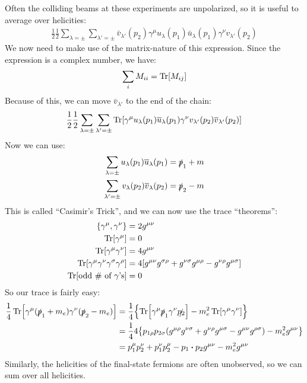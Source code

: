 Often the colliding beams at these experiments are unpolarized, so it is useful to average over helicities:
\begin{align*}
  \frac12\frac12\sum_{\lambda=\pm}\sum_{\lambda'=\pm}
  \bar{v}_{\lambda'}(p_2)\gamma^\mu u_\lambda(p_1)
  \bar{u}_{\lambda}(p_1)\gamma^\nu v_{\lambda'}(p_2)
\end{align*}
We now need to make use of the matrix-nature of this expression. Since the expression is a complex number, we have:
\begin{align*}
  \sum_i M_{ii}=\Tr[M_{ij}]
\end{align*}
Because of this, we can move $\bar{v}_{\lambda'}$ to the end of the chain:
\begin{align*}
  \frac12\frac12\sum_{\lambda=\pm}\sum_{\lambda'=\pm}\Tr[
  \gamma^\mu u_\lambda(p_1)\overline{u}_{\lambda}(p_1)
  \gamma^\nu v_{\lambda'}(p_2)\overline{v}_{\lambda'}(p_2)]
\end{align*}
Now we can use:
\begin{align*}
  \sum_{\lambda=\pm}u_\lambda(p_1)\overline{u}_\lambda(p_1)&=\slashed{p}_1+m\\
  \sum_{\lambda'=\pm}v_\lambda(p_2)\overline{v}_\lambda(p_2)&=\slashed{p}_2-m
\end{align*}
This is called ``Casimir's Trick'', and we can now use the trace ``theorems'':
\begin{align*}
  \acomm{\gamma^\mu}{\gamma^\nu}&=2g^{\mu\nu}\\
  \Tr[\gamma^\mu]&=0\\
  \Tr[\gamma^\mu\gamma^\nu]&=4g^{\mu\nu}\\
  \Tr[\gamma^\mu\gamma^\nu\gamma^\sigma\gamma^\rho]&=
  4[g^{\mu\nu}g^{\sigma\rho}+g^{\nu\sigma}g^{\mu\rho}-g^{\nu\rho}g^{\mu\sigma}]\\
  \Tr[\text{odd \# of $\gamma$'s}]&=0
\end{align*}
So our trace is fairly easy:
\begin{align*}
  \frac14\Tr[\gamma^\mu(\sla{p}_1+m_e)\gamma^\nu(\sla{p}_2-m_e)]
  &=\frac14\qty{\Tr[\gamma^\mu\sla{p}_1\gamma^\nu\sla{p_2}]
    -m_e^2\Tr[\gamma^\mu\gamma^\nu]}\\
  &=\frac144\qty{p_{1\rho}p_{2\sigma}
    (g^{\mu\rho}g^{\nu\sigma}+g^{\nu\rho}g^{\mu\sigma}-g^{\mu\nu}g^{\rho\sigma})
    -m_e^2g^{\mu\nu}}\\
  &=p_1^\mu p_2^\nu+p_1^\nu p_2^\mu-p_1\vdot p_2g^{\mu\nu}-m_e^2g^{\mu\nu}
\end{align*}
Similarly, the helicities of the final-state fermions are often unobserved, so we can sum over all helicities. 